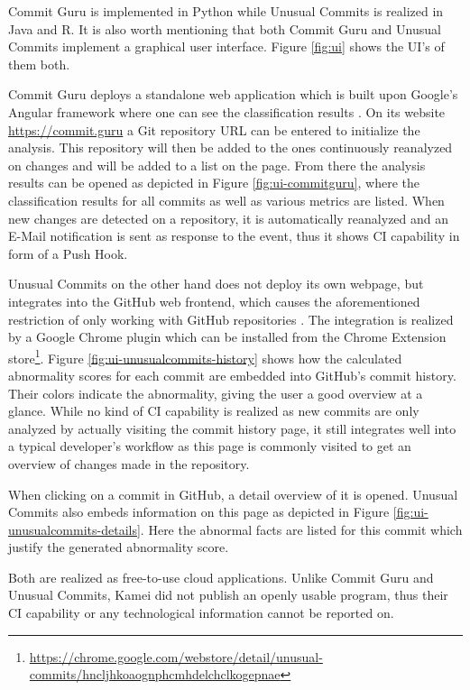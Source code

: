 Commit Guru is implemented in Python while Unusual Commits is realized in Java and R. It is also worth mentioning that both Commit Guru and Unusual Commits implement a graphical user interface. 
Figure \ref{fig:ui} shows the UI's of them both. 

Commit Guru deploys a standalone web application which is built upon Google's Angular framework where one can see the classification results \cite{Rosen2015}. On its website \url{https://commit.guru} a Git repository URL can be entered to initialize the analysis. This repository will then be added to the ones continuously reanalyzed on changes and will be added to a list on the page. From there the analysis results can be opened as depicted in Figure \ref{fig:ui-commitguru}, where the classification results for all commits as well as various metrics are listed. When new changes are detected on a repository, it is automatically reanalyzed and an E-Mail notification is sent as response to the event, thus it shows CI capability in form of a Push Hook.

Unusual Commits on the other hand does not deploy its own webpage, but integrates into the GitHub web frontend, which causes the aforementioned restriction of only working with GitHub repositories \cite{Goyal2017}. The integration is realized by a Google Chrome plugin which can be installed from the Chrome Extension store\footnote{\url{https://chrome.google.com/webstore/detail/unusual-commits/hncljhkoaognphcmhdelchclkogepnae}}. Figure \ref{fig:ui-unusualcommits-history} shows how the calculated abnormality scores for each commit are embedded into GitHub's commit history. Their colors indicate the abnormality, giving the user a good overview at a glance. While no kind of CI capability is realized as new commits are only analyzed by actually visiting the commit history page, it still integrates well into a typical developer's workflow as this page is commonly visited to get an overview of changes made in the repository. 

When clicking on a commit in GitHub, a detail overview of it is opened. Unusual Commits also embeds information on this page as depicted in Figure \ref{fig:ui-unusualcommits-details}. Here the abnormal facts are listed for this commit which justify the generated abnormality score.

Both are realized as free-to-use cloud applications.
Unlike Commit Guru and Unusual Commits, Kamei did not publish an openly usable program, thus their CI capability or any technological information cannot be reported on.

